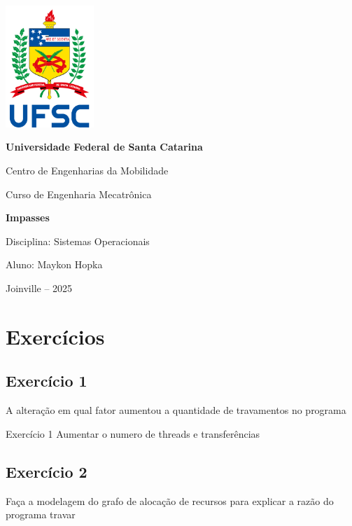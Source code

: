 \documentclass[14pt,a4paper]{article}
\begin{document}
\begin{titlepage}
    \centering
    
    \includegraphics[width=0.25\textwidth]{logo_ufsc.png}\par\vspace{1cm}
    
    {\Large\bfseries Universidade Federal de Santa Catarina \par}
    \vspace{0.5cm}
    {\large Centro de Engenharias da Mobilidade \par}
    {\large Curso de Engenharia Mecatrônica \par}
    \vfill
    
    {\Huge\bfseries Impasses \par}
    \vspace{0.5cm}
    {\Large Disciplina: Sistemas Operacionais\par}
    \vspace{0.3cm}
    {\large Aluno: Maykon Hopka \par}
    \vfill
    
    {\large Joinville – 2025}
\end{titlepage}

\section{Exercícios}

\subsection*{Exercício 1}
A alteração em qual fator aumentou a quantidade de travamentos no programa

\begin{solucao}{Exercício 1}{}
 Aumentar o numero de threads e transferências
\end{solucao}

\subsection*{Exercício 2}
Faça a modelagem do grafo de alocação de recursos para explicar a razão do programa travar
\end{document}
